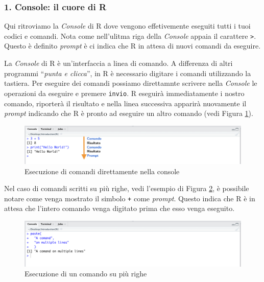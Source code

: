 \documentclass[
]{book}
\begin{document}
\hypertarget{console-il-cuore-di-r}{%
\subsubsection*{1. Console: il cuore di R}\label{console-il-cuore-di-r}}

Qui ritroviamo la \emph{Console} di R dove vengono effetivemente eseguiti tutti i tuoi codici e comandi. Nota come nell'ulitma riga della \emph{Console} appaia il carattere \texttt{\textgreater{}}. Questo è definito \emph{prompt} è ci indica che R in attesa di nuovi comandi da eseguire.

La \emph{Console} di R è un'interfaccia a linea di comando. A differenza di altri programmi ``\emph{punta e clicca}'', in R è necessario digitare i comandi utilizzando la tastiera. Per eseguire dei comandi possiamo direttamnte scrivere nella \emph{Console} le operazioni da eseguire e premere \texttt{invio}. R eseguirà immediatamente i nostro comando, riporterà il risultato e nella linea successiva apparirà nuovamente il \emph{prompt} indicando che R è pronto ad eseguire un altro comando (vedi Figura \ref{fig:comand-sequence}).

\begin{figure}

{\centering \includegraphics[width=0.95\linewidth]{images/comand-sequence} 

}

\caption{Esecuzione di comandi direttamente nella console}\label{fig:comand-sequence}
\end{figure}

Nel caso di comandi scritti su più righe, vedi l'esempio di Figura \ref{fig:multiple-line-comand}, è possibile notare come venga mostrato il simbolo \texttt{+} come \emph{prompt}. Questo indica che R è in attesa che l'intero comando venga digitato prima che esso venga eseguito.

\begin{figure}

{\centering \includegraphics[width=0.95\linewidth]{images/multiple-line-comand} 

}

\caption{Esecuzione di un comando su più righe}\label{fig:multiple-line-comand}
\end{figure}
\end{document}
